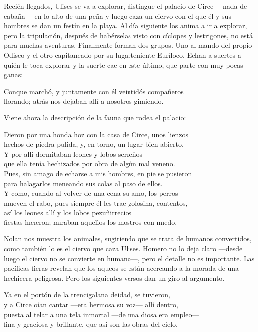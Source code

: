 Recién llegados, Ulises se va a explorar, distingue el palacio de Circe ---nada de cabaña--- en lo alto de una peña y luego caza un ciervo con el que él y sus hombres se dan un festín en la playa. Al día siguiente los anima a ir a explorar, pero la tripulación, después de habérselas visto con cíclopes y lestrigones, no está para muchas aventuras. Finalmente forman dos grupos. Uno al mando del propio Odiseo y el otro capitaneado por su lugarteniente Euríloco. Echan a suertes a quién le toca explorar y la suerte cae en este último, que parte con muy pocas ganas:

\begin{versocita}
Conque marchó, y juntamente con él veintidós compañeros\\
llorando; atrás nos dejaban allí a nosotros gimiendo.
\end{versocita}

Viene ahora la descripción de la fauna que rodea el palacio:

\begin{versocita}
Dieron por una honda hoz con la casa de Circe, unos lienzos\\
hechos de piedra pulida, y, en torno, un lugar bien abierto.\\
Y por allí dormitaban leones y lobos serreños\\
que ella tenía hechizados por obra de algún mal veneno.\\
Pues, sin amago de echarse a mis hombres, en pie se pusieron\\
para halagarlos meneando sus colas al paso de ellos.\\
Y como, cuando al volver de una cena su amo, los perros\\
mueven el rabo, pues siempre él les trae golosina, contentos,\\
así los leones allí y los lobos pezuñirrecios\\
fiestas hicieron; miraban aquellos los mostros con miedo.
\end{versocita}

Nolan nos muestra los animales, sugiriendo que se trata de humanos convertidos, como también lo es el ciervo que caza Ulises. Homero no lo deja claro ---desde luego el ciervo no se convierte en humano---, pero el detalle no es importante. Las pacíficas fieras revelan que los aqueos se están acercando a la morada de una hechicera peligrosa. Pero los siguientes versos dan un giro al argumento.

\begin{versocita}
Ya en el portón de la trencigalana deidad, se tuvieron,\\
y a Circe oían cantar ---era hermosa su voz--- allí dentro,\\
puesta al telar a una tela inmortal ---de una diosa era empleo---\\
fina y graciosa y brillante, que así son las obras del cielo.
\end{versocita}

